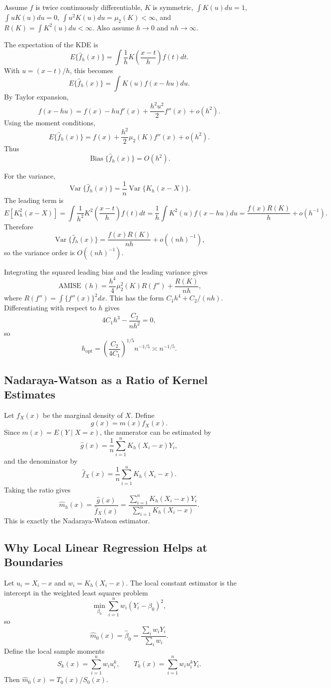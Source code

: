 \documentclass[12pt,a4paper]{article}
\begin{document}
Assume \(f\) is twice continuously differentiable, \(K\) is symmetric, \(\int K(u)du=1\), \(\int uK(u)du=0\), \(\int u^2K(u)du=\mu_2(K)<\infty\), and \(R(K)=\int K^2(u)du<\infty\). Also assume \(h\to0\) and \(nh\to\infty\).

The expectation of the KDE is
\[
E\{\hat f_h(x)\}
=\int \frac{1}{h}K\left(\frac{x-t}{h}\right)f(t)dt.
\]
With \(u=(x-t)/h\), this becomes
\[
E\{\hat f_h(x)\}=\int K(u)f(x-hu)du.
\]
By Taylor expansion,
\[
f(x-hu)=f(x)-hu f'(x)+\frac{h^2u^2}{2}f''(x)+o(h^2).
\]
Using the moment conditions,
\[
E\{\hat f_h(x)\}=f(x)+\frac{h^2}{2}\mu_2(K)f''(x)+o(h^2).
\]
Thus
\[
\operatorname{Bias}\{\hat f_h(x)\}=O(h^2).
\]

For the variance,
\[
\operatorname{Var}\{\hat f_h(x)\}
=\frac{1}{n}\operatorname{Var}\{K_h(x-X)\}.
\]
The leading term is
\[
E[K_h^2(x-X)]
=\int \frac{1}{h^2}K^2\left(\frac{x-t}{h}\right)f(t)dt
=\frac{1}{h}\int K^2(u)f(x-hu)du
=\frac{f(x)R(K)}{h}+o(h^{-1}).
\]
Therefore
\[
\operatorname{Var}\{\hat f_h(x)\}
=\frac{f(x)R(K)}{nh}+o((nh)^{-1}),
\]
so the variance order is \(O((nh)^{-1})\).

Integrating the squared leading bias and the leading variance gives
\[
\operatorname{AMISE}(h)
=\frac{h^4}{4}\mu_2^2(K)R(f'')+\frac{R(K)}{nh},
\]
where \(R(f'')=\int \{f''(x)\}^2dx\). This has the form \(C_1h^4+C_2/(nh)\). Differentiating with respect to \(h\) gives
\[
4C_1h^3-\frac{C_2}{nh^2}=0,
\]
so
\[
h_{\mathrm{opt}}=\left(\frac{C_2}{4C_1}\right)^{1/5}n^{-1/5}\asymp n^{-1/5}.
\]

\subsection{Nadaraya-Watson as a Ratio of Kernel Estimates}

Let \(f_X(x)\) be the marginal density of \(X\). Define
\[
g(x)=m(x)f_X(x).
\]
Since \(m(x)=E(Y\mid X=x)\), the numerator can be estimated by
\[
\hat g(x)=\frac{1}{n}\sum_{i=1}^{n}K_h(X_i-x)Y_i,
\]
and the denominator by
\[
\hat f_X(x)=\frac{1}{n}\sum_{i=1}^{n}K_h(X_i-x).
\]
Taking the ratio gives
\[
\hat m_h(x)=\frac{\hat g(x)}{\hat f_X(x)}
=
\frac{\sum_{i=1}^{n}K_h(X_i-x)Y_i}
{\sum_{i=1}^{n}K_h(X_i-x)}.
\]
This is exactly the Nadaraya-Watson estimator.

\subsection{Why Local Linear Regression Helps at Boundaries}

Let \(u_i=X_i-x\) and \(w_i=K_h(X_i-x)\). The local constant estimator is the intercept in the weighted least squares problem
\[
\min_{\beta_0}\sum_{i=1}^{n}w_i(Y_i-\beta_0)^2,
\]
so
\[
\hat m_{0}(x)=\hat\beta_0=\frac{\sum_i w_iY_i}{\sum_i w_i}.
\]
Define the local sample moments
\[
S_k(x)=\sum_{i=1}^{n}w_i u_i^k,\qquad
T_k(x)=\sum_{i=1}^{n}w_i u_i^kY_i.
\]
Then \(\hat m_0(x)=T_0(x)/S_0(x)\).
\end{document}
